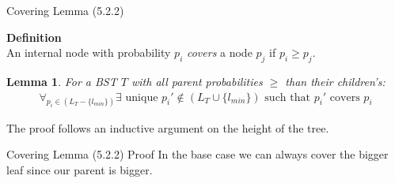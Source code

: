 \documentclass{beamer}
\theoremstyle{plain}
\newtheorem{lem}[thm]{Lemma}
\begin{document}
\begin{frame}{Covering Lemma (5.2.2)}

\textbf{Definition} \\
An internal node with probability $p_i$ \textit{covers} a node $p_j$ if $p_i \geq p_j$.\\

\begin{lem}
For a BST $T$ with all parent probabilities $\geq$ than their children's:
\begin{align*}
\forall_{p_i \in (L_T-\{l_{min}\})} \exists \text{ unique } p_i' \notin (L_T \cup \{l_{min}\}) \text{ such that } p_i' \text{ covers } p_i
\end{align*}
\end{lem}

The proof follows an inductive argument on the height of the tree.
\end{frame}

\begin{frame}{Covering Lemma (5.2.2) Proof}
In the base case we can always cover the bigger leaf since our parent is bigger.

\begin{center}
\end{center}
\end{frame}
\end{document}
